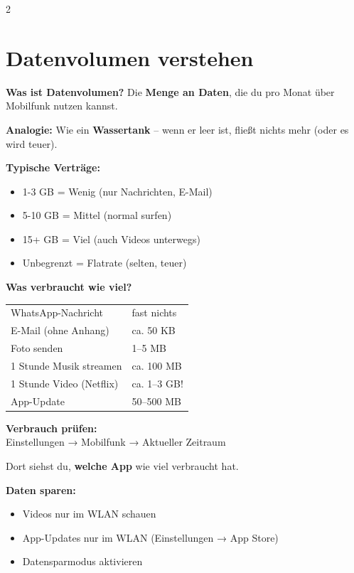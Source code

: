 \documentclass[a4paper,landscape,8pt]{extarticle}
\begin{document}
\begin{multicols}{2}

\section*{\textcolor{dataviolet}{Datenvolumen verstehen}}

\textbf{Was ist Datenvolumen?} Die \textbf{Menge an Daten}, die du pro Monat über Mobilfunk nutzen kannst.

\textbf{Analogie:} Wie ein \textbf{Wassertank} -- wenn er leer ist, fließt nichts mehr (oder es wird teuer).

\textbf{Typische Verträge:}
\begin{itemize}
\item 1-3 GB = Wenig (nur Nachrichten, E-Mail)
\item 5-10 GB = Mittel (normal surfen)
\item 15+ GB = Viel (auch Videos unterwegs)
\item Unbegrenzt = Flatrate (selten, teuer)
\end{itemize}

\vspace{2mm}

\textbf{Was verbraucht wie viel?}

\renewcommand{\arraystretch}{1.3}
\begin{tabular}{@{}p{4cm}p{3cm}@{}}
WhatsApp-Nachricht & fast nichts \\
E-Mail (ohne Anhang) & ca. 50 KB \\
Foto senden & 1--5 MB \\
1 Stunde Musik streamen & ca. 100 MB \\
1 Stunde Video (Netflix) & ca. 1--3 GB! \\
App-Update & 50--500 MB \\
\end{tabular}
\renewcommand{\arraystretch}{1}

\vspace{2mm}

\textbf{Verbrauch prüfen:}\\
Einstellungen → Mobilfunk → \glqq Aktueller Zeitraum\grqq{}

Dort siehst du, \textbf{welche App} wie viel verbraucht hat.

\vspace{2mm}

\textbf{Daten sparen:}
\begin{itemize}
\item Videos nur im WLAN schauen
\item App-Updates nur im WLAN (Einstellungen → App Store)
\item \glqq Datensparmodus\grqq{} aktivieren
\end{itemize}


\end{multicols}
\end{document}

